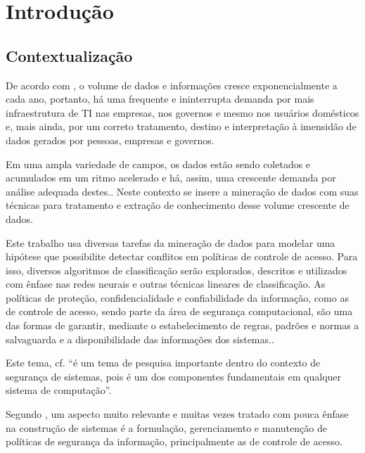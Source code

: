 \documentclass[
	12pt,				%
	openright,			%
	twoside,			%
	a4paper,			%
	english,			%
	french,				%
	spanish,			%
	brazil				%
	]{abntex2}
\begin{document}
\textual

\chapter{Introdução} \label{introducao}
\section{Contextualização} \label{contextualizacao}
De acordo com , o volume de dados e informações cresce exponencialmente a cada ano, portanto, há uma frequente e ininterrupta demanda por mais infraestrutura de TI nas empresas, nos governos e mesmo nos usuários domésticos e, mais ainda, por um correto tratamento, destino e interpretação à imensidão de dados gerados por pessoas, empresas e governos.\cite{machado2014} 

Em uma ampla variedade de campos, os dados estão sendo coletados e acumulados em um ritmo acelerado e há, assim, uma crescente demanda por análise adequada destes.\cite{fayyad1996, lima_fraud_2012}. Neste contexto se insere a mineração de dados com suas técnicas para tratamento e extração de conhecimento desse volume crescente de dados.\cite{Boscarioli2017, ferrari2017}

Este trabalho usa diversas tarefas da mineração de dados para modelar uma hipótese que possibilite detectar conflitos em políticas de controle de acesso. Para isso, diversos algoritmos de classificação serão explorados, descritos e utilizados com ênfase nas redes neurais e outras técnicas lineares de classificação. As políticas de proteção, confidencialidade e confiabilidade da informação, como as de controle de acesso, sendo parte da área de segurança computacional, são uma das formas de garantir, mediante o estabelecimento de regras, padrões e normas a salvaguarda e a disponibilidade das informações dos sistemas.\cite{sarkis2017}\cite{bui_efficient_2019}. 

Este tema, cf.  ``é um tema de pesquisa importante dentro do contexto de segurança de sistemas, pois é um dos componentes fundamentais em qualquer sistema de computação''.

Segundo , um aspecto muito relevante e muitas vezes tratado com pouca ênfase na construção de sistemas é a formulação, gerenciamento e manutenção de políticas de segurança da informação, principalmente as de controle de acesso. 
\end{document}
